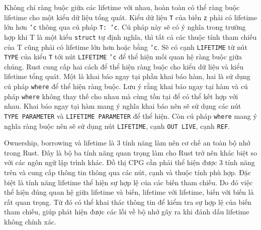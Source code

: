 Không chỉ ràng buộc giữa các lifetime với nhau, hoàn toàn có thể ràng buộc lifetime cho một kiểu dữ liệu tổng quát.
Kiểu dữ liệu \texttt{T} của biến \texttt{z} phải có lifetime lớn hơn \texttt{'c} thông qua cú pháp \texttt{T: 'c}.
Cú pháp này sẽ có ý nghĩa trong trường hợp khi T là một kiểu \texttt{struct} tự định nghĩa, thì tất cả các thuộc tính tham chiếu của T cũng phải có lifetime lớn hơn hoặc bằng \texttt{'c}.
Sẽ có cạnh \texttt{LIFETIME} từ nút \texttt{TYPE} của kiểu \texttt{T} tới nút \texttt{LIFETIME} \texttt{'c} để thể hiện mối quan hệ ràng buộc giữa chúng.
Rust cung cấp hai cách để thể hiện ràng buộc cho kiểu dữ liệu và kiểu lifetime tổng quát.
Một là khai báo ngay tại phần khai báo hàm, hai là sử dụng cú pháp \texttt{where} để thể hiện ràng buộc.
Lưu ý rằng khai báo ngay tại hàm và cú pháp \texttt{where} không thay thế cho nhau mà cùng tồn tại để có thể kết hợp với nhau.
Khai báo ngay tại hàm mang ý nghĩa khai báo nên sẽ sử dụng các nút \texttt{TYPE PARAMETER} và \texttt{LIFETIME PARAMETER} để thể hiện.
Còn cú pháp \texttt{where} mang ý nghĩa ràng buộc nên sẽ sử dụng nút \texttt{LIFETIME}, cạnh \texttt{OUT LIVE}, cạnh \texttt{REF}.

Ownership, borrowing và lifetime là 3 tính năng làm nên cơ chế an toàn bộ nhớ trong Rust.
Đây là bộ ba tính năng quan trọng làm cho Rust trở nên khác biệt so với các ngôn ngữ lập trình khác.
Đồ thị CPG cần phải thể hiện được 3 tính năng trên và cung cấp thông tin thông qua các nút, cạnh và thuộc tính phù hợp.
Đặc biệt là tính năng lifetime thể hiện sự hợp lệ của các biến tham chiếu.
Do đó việc thể hiện đúng quan hệ giữa lifetime và biến, lifetime với lifetime, biến với biến là rất quan trọng.
Từ đó có thể khai thác thông tin để kiểm tra sự hợp lệ của biến tham chiếu, giúp phát hiện được các lỗi về bộ nhớ gây ra khi đánh dấu lifetime không chính xác.
